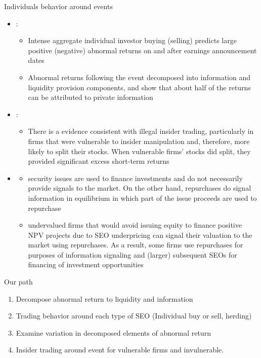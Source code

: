 \documentclass{beamer}
\begin{document}
	
	\begin{frame}{Individuals behavior around events}
		\begin{itemize}\scriptsize
			\item 	\cite{kaniel2012individual} :
			\begin{itemize}\tiny
				\item Intense
				aggregate individual investor buying (selling) predicts large positive (negative) abnormal returns on and after earnings announcement dates
				\item 
				Abnormal returns following the event decomposed  into information and liquidity provision components, and show that about half of the returns can be attributed to private information
			\end{itemize} 
			\item \cite{nguyen2017stock}:
			\begin{itemize}\tiny
				\item There is a evidence consistent with illegal insider trading,
				particularly in firms that were vulnerable to insider manipulation and, therefore, more likely to split
				their stocks. When vulnerable firms’ stocks did split, they provided significant excess short-term
				returns
				
				
				
			\end{itemize}
			\item 
			\begin{itemize}\tiny
				\item  \cite{constantinides1989optimal}
				security issues are used to finance investments and do not necessarily provide signals to the
				market. On the other hand, repurchases do signal information in equilibrium in which part of the
				issue proceeds are used to repurchase
				\item \cite{bond2016buying} undervalued firms that
				would avoid issuing equity to finance positive NPV projects due to SEO underpricing can signal
				their valuation to the market using repurchases. As a result, some firms use repurchases for
				purposes of information signaling and (larger) subsequent SEOs for financing of investment opportunities
			\end{itemize}
		\end{itemize}
	\end{frame}
	\begin{frame}{Our path}
		\begin{enumerate}
			\item Decompose abnormal return to liquidity and information
			\item Trading behavior around each type of SEO (Individual buy or sell, herding)
			\item Examine variation in decomposed elements of abnormal return
			\item Insider trading around event for vulnerable firms and invulnerable.
		\end{enumerate}
	\end{frame}
	
\end{document}
